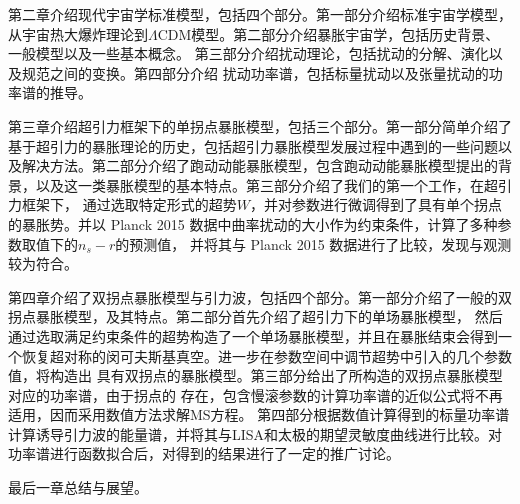第二章介绍现代宇宙学标准模型，包括四个部分。第一部分介绍标准宇宙学模型，从宇宙热大爆炸理论到$\Lambda$CDM模型。第二部分介绍暴胀宇宙学，包括历史背景、一般模型以及一些基本概念。
第三部分介绍扰动理论，包括扰动的分解、演化以及规范之间的变换。第四部分介绍
扰动功率谱，包括标量扰动以及张量扰动的功率谱的推导。

第三章介绍超引力框架下的单拐点暴胀模型，包括三个部分。第一部分简单介绍了基于超引力的暴胀理论的历史，包括超引力暴胀模型发展过程中遇到的一些问题以及解决方法。第二部分介绍了跑动动能暴胀模型，包含跑动动能暴胀模型提出的背景，以及这一类暴胀模型的基本特点。第三部分介绍了我们的第一个工作，在超引力框架下，
通过选取特定形式的超势$W$，并对参数进行微调得到了具有单个拐点的暴胀势。并以
Planck 2015
数据中曲率扰动的大小作为约束条件，计算了多种参数取值下的$n_{s}-r$的预测值，
并将其与 Planck 2015 数据进行了比较，发现与观测较为符合。

第四章介绍了双拐点暴胀模型与引力波，包括四个部分。第一部分介绍了一般的双拐点暴胀模型，及其特点。第二部分首先介绍了超引力下的单场暴胀模型，
然后通过选取满足约束条件的超势构造了一个单场暴胀模型，并且在暴胀结束会得到一个恢复超对称的闵可夫斯基真空。进一步在参数空间中调节超势中引入的几个参数值，将构造出
具有双拐点的暴胀模型。第三部分给出了所构造的双拐点暴胀模型对应的功率谱，由于拐点的
存在，包含慢滚参数的计算功率谱的近似公式将不再适用，因而采用数值方法求解MS方程。
第四部分根据数值计算得到的标量功率谱计算诱导引力波的能量谱，并将其与LISA\citep{amaro2017laser}和太极\citep{guo2018taiji}的期望灵敏度曲线进行比较。对功率谱进行函数拟合后，对得到的结果进行了一定的推广讨论。

最后一章总结与展望。
